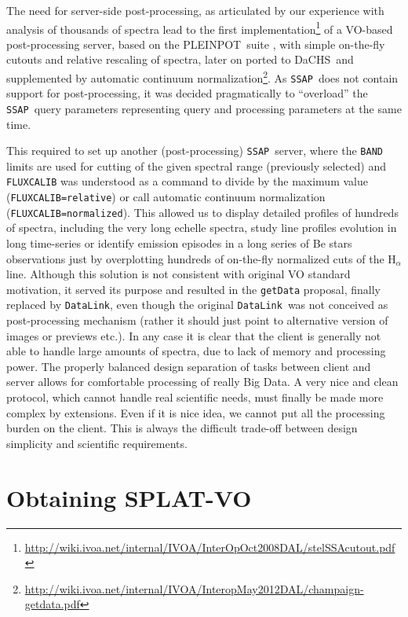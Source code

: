 \documentclass[final,authoryear,5p,times,twocolumn]{elsarticle}
\newcommand{\datalink}{\texttt{DataLink}}
\newcommand{\ssap}{\texttt{SSAP}}
\newcommand{\dachs}{\textsf{\small DaCHS}}
\newcommand{\pleinpot}{\textsf{\small PLEINPOT}}
\begin{document}
The need for server-side post-processing, as articulated by our experience with
analysis of thousands of spectra lead to the first
implementation\footnote{\url{http://wiki.ivoa.net/internal/IVOA/InterOpOct2008DAL/stelSSAcutout.pdf}}
of a VO-based post-processing server, based on the \pleinpot\ suite
\citep{2005ASPC..347..385C}, with simple on-the-fly cutouts and relative
rescaling of spectra, later on ported to \dachs\ and supplemented by automatic
continuum
normalization\footnote{\url{http://wiki.ivoa.net/internal/IVOA/InteropMay2012DAL/champaign-getdata.pdf}}.
As \ssap\ does not contain support for post-processing, it was decided
pragmatically to ``overload'' the \ssap\ query parameters representing query
and processing parameters at the same time.

This required to set up another (post-processing) \ssap\ server, where the
\texttt{BAND} limits are used for cutting of the given spectral range
(previously selected) and \texttt{FLUXCALIB} was understood as a command to
divide by the maximum value (\texttt{FLUXCALIB=relative}) or call automatic
continuum normalization (\texttt{FLUXCALIB=normalized}).  This allowed us to
display detailed profiles of hundreds of spectra, including the very long
echelle spectra, study line profiles evolution in long time-series or identify
emission episodes in a long series of Be stars observations just by
overplotting hundreds of on-the-fly normalized cuts of the H$_\alpha$ line.
Although this solution is not consistent with original VO standard motivation,
it served its purpose and resulted in the \texttt{getData} proposal, finally
replaced by \datalink, even though the original \datalink\ was not conceived as
post-processing mechanism (rather it should just point to alternative version
of images or previews etc.).  In any case it is clear that the client is
generally not able to handle large amounts of spectra, due to lack of memory
and processing power. The properly balanced design separation of tasks between
client and server allows for comfortable processing of really Big Data.  A very
nice and clean protocol, which cannot handle real scientific needs, must
finally be made more complex by extensions. Even if it is nice idea, we cannot
put all the processing burden on the client.  This is always the difficult
trade-off between design simplicity and scientific requirements.

\section{Obtaining SPLAT-VO}
\end{document}
